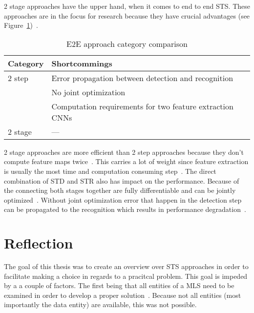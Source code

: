 2 stage approaches have the upper hand, when it comes to end to end \ac{STS}.
These approaches are in the focus for research because they have crucial
advantages (see Figure~\ref{tb:E2E-comparison})~\citep{chen_text_2021}.
\begin{table}[h]
    \centering\scriptsize%
    \begin{tabular}{p{}p{}}
        \textbf{Category} & \textbf{Shortcommings} \\
        \toprule
        2 step & Error propagation between detection and
            recognition~\citep{chen_text_2021,long_scene_2021}\\
        & No joint optimization~\citep{qiao_text_2021, chen_text_2021}\\
        & Computation requirements for two feature extraction
            CNNs~\citep{liu_fots_2018,chen_text_2021} \\
        2 stage & --- \\
        \bottomrule
    \end{tabular}
    \caption{E2E approach category comparison\label{tb:E2E-comparison}}
\end{table}
2 stage approaches are more efficient than 2 step approaches because they don't compute feature maps
twice~\citep{liu_fots_2018,chen_text_2021}.
This carries a lot of weight since feature extraction is usually the most time and computation
consuming step~\citep{liu_fots_2018}.
The direct combination of \ac{STD} and \ac{STR} also has impact on the performance.
Because of the connecting both stages together are fully differentiable and can be jointly
optimized~\citep{chen_text_2021,long_scene_2021,qiao_text_2021}.
Without joint optimization error that happen in the detection step can be propagated to the
recognition which results in performance degradation~\citep{chen_text_2021,qiao_text_2021}.

\section{Reflection}
The goal of this thesis was to create an overview over \ac{STS} approaches in order to facilitate
making a choice in regards to a pracitcal problem.
This goal is impeded by a a couple of factors.
The first being that all entities of a \ac{MLS} need to be examined in order to develop a proper
solution~\citep{siebert_construction_2021,nakamichi_requirements-driven_2020}.
Because not all entities (most importantly the data entity) are available, this was not possible.

